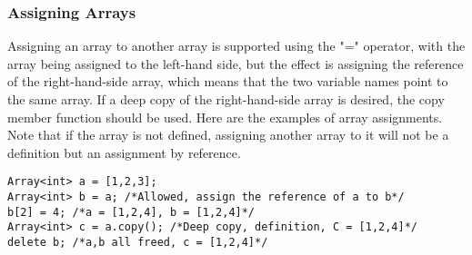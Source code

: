 \subsubsection{Assigning Arrays}
Assigning an array to another array is supported using the "=" operator, with the array being assigned to the left-hand side, but the effect is assigning the reference of the right-hand-side array, which means that the two variable names point to the same array. If a deep copy of the right-hand-side array is desired, the copy member function should be used. Here are the examples of array assignments. Note that if the array is not defined, assigning another array to it will not be a definition but an assignment by reference.
\begin{lstlisting}[caption={array\_delete.csm}, captionpos=b]
Array<int> a = [1,2,3];
Array<int> b = a; /*Allowed, assign the reference of a to b*/
b[2] = 4; /*a = [1,2,4], b = [1,2,4]*/
Array<int> c = a.copy(); /*Deep copy, definition, C = [1,2,4]*/
delete b; /*a,b all freed, c = [1,2,4]*/

\end{lstlisting}